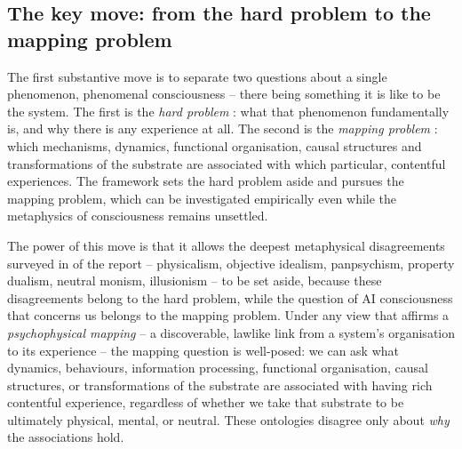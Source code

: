 \documentclass[11pt, a4paper, onecolumn, gdm]{google}
\begin{document}
\subsection{The key move: from the hard problem to the mapping problem}\label{the-key-move-from-the-hard-problem-to-the-mapping-problem}

The first substantive move is to separate two questions about a single phenomenon, phenomenal consciousness -- there being something it is like to be the system.
The first is the \emph{hard problem} \citep{chalmers1995}: what that phenomenon fundamentally is, and why there is any experience at all.
The second is the \emph{mapping problem} \citetext{\citealp{bourget2019}; closely related to Seth's \emph{real problem}, \citealp{seth2016}}: which mechanisms, dynamics, functional organisation, causal structures and transformations of the substrate are associated with which particular, contentful experiences.
The framework sets the hard problem aside and pursues the mapping problem, which can be investigated empirically even while the metaphysics of consciousness remains unsettled.

The power of this move is that it allows the deepest metaphysical disagreements surveyed in  of the report -- physicalism, objective idealism, panpsychism, property dualism, neutral monism, illusionism -- to be set aside, because these disagreements belong to the hard problem, while the question of AI consciousness that concerns us belongs to the mapping problem.
Under any view that affirms a \emph{psychophysical mapping} -- a discoverable, lawlike link from a system's organisation to its experience -- the mapping question is well-posed: we can ask what dynamics, behaviours, information processing, functional organisation, causal structures, or transformations of the substrate are associated with having rich contentful experience, regardless of whether we take that substrate to be ultimately physical, mental, or neutral.
These ontologies disagree only about \emph{why} the associations hold.
\end{document}

